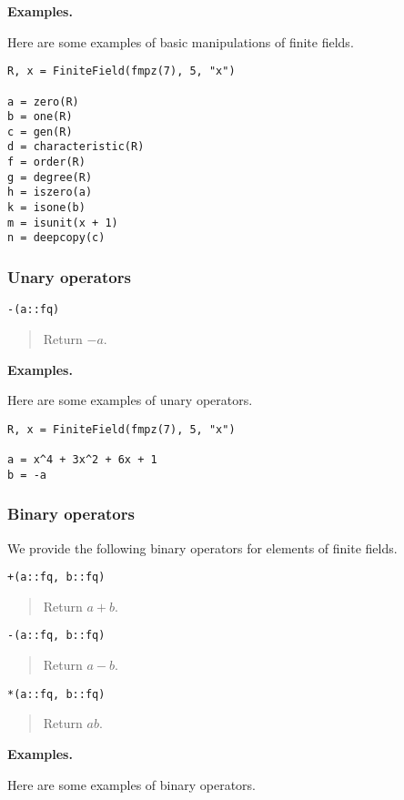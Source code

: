 \documentclass[a4paper,10pt]{article}
\newcommand{\desc}[1]{\vspace{-3mm}\begin{quote}#1\end{quote}}
\begin{document}
{{\textbf{Examples.}

Here are some examples of basic manipulations of finite fields.

\begin{lstlisting}
R, x = FiniteField(fmpz(7), 5, "x")

a = zero(R)
b = one(R)
c = gen(R)
d = characteristic(R)
f = order(R)
g = degree(R)
h = iszero(a)
k = isone(b)
m = isunit(x + 1)
n = deepcopy(c)
\end{lstlisting}

\subsubsection{Unary operators}

\begin{lstlisting}
-(a::fq)
\end{lstlisting}

\desc{Return $-a$.}

\textbf{Examples.}

Here are some examples of unary operators.

\begin{lstlisting}
R, x = FiniteField(fmpz(7), 5, "x")

a = x^4 + 3x^2 + 6x + 1
b = -a
\end{lstlisting}

\subsubsection{Binary operators}

We provide the following binary operators for elements of
finite fields.

\begin{lstlisting}
+(a::fq, b::fq)
\end{lstlisting}

\desc{Return $a + b$.}

\begin{lstlisting}
-(a::fq, b::fq)
\end{lstlisting}

\desc{Return $a - b$.}

\begin{lstlisting}
*(a::fq, b::fq)
\end{lstlisting}

\desc{Return $ab$.}

\textbf{Examples.}

Here are some examples of binary operators.

}}
\end{document}
